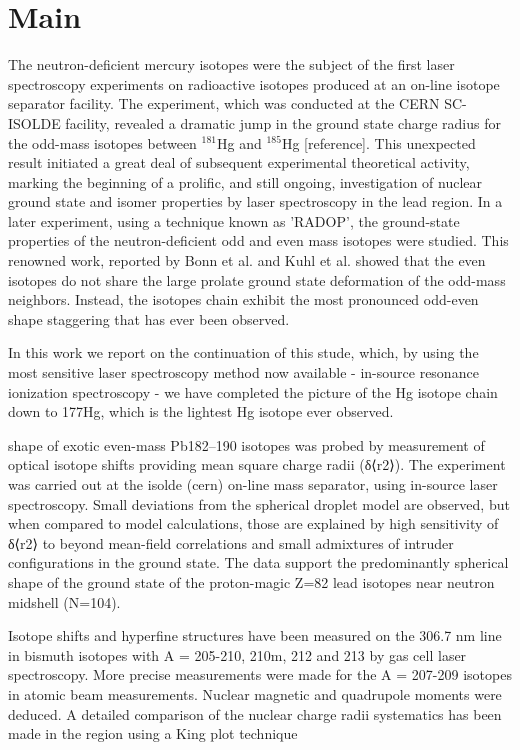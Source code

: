 \section{Main} 


The neutron-deficient mercury isotopes were the subject of the first laser spectroscopy experiments on radioactive isotopes produced at an on-line isotope separator facility.  The experiment, which was conducted at the CERN SC-ISOLDE facility, revealed a dramatic jump in the ground state charge radius for the odd-mass isotopes between $^{181}$Hg and $^{185}$Hg [reference].  This unexpected result initiated a great deal of subsequent experimental theoretical activity, marking the beginning of a prolific, and still ongoing, investigation of nuclear ground state and isomer properties by laser spectroscopy in the lead region.  In a later experiment, using a technique known as 'RADOP', the ground-state properties of the neutron-deficient odd and even mass isotopes were studied.  This renowned work, reported by Bonn et al. and Kuhl et al. showed that the even isotopes do not share the large prolate ground state deformation of the odd-mass neighbors.  Instead, the isotopes chain exhibit the most pronounced odd-even shape staggering that has ever been observed.

In this work we report on the continuation of this stude, which, by using the most sensitive laser spectroscopy method now available - in-source resonance ionization spectroscopy - we have completed the picture of the Hg isotope chain down to 177Hg, which is the lightest Hg isotope ever observed.

shape of exotic even-mass Pb182–190 isotopes was probed by measurement of optical isotope shifts providing mean square charge radii (δ⟨r2⟩). The experiment was carried out at the isolde (cern) on-line mass separator, using in-source laser spectroscopy. Small deviations from the spherical droplet model are observed, but when compared to model calculations, those are explained by high sensitivity of δ⟨r2⟩ to beyond mean-field correlations and small admixtures of intruder configurations in the ground state. The data support the predominantly spherical shape of the ground state of the proton-magic Z=82 lead isotopes near neutron midshell (N=104).


Isotope shifts and hyperfine structures have been measured on the 306.7 nm line in bismuth isotopes with A = 205-210, 210m, 212 and 213 by gas cell laser spectroscopy. More precise measurements were made for the A = 207-209 isotopes in atomic beam measurements. Nuclear magnetic and quadrupole moments were deduced. A detailed comparison of the nuclear charge radii systematics has been made in the region using a King plot technique

